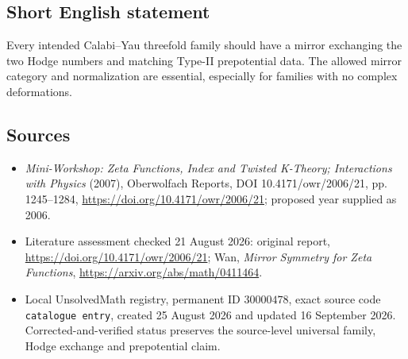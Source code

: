 \documentclass[11pt]{article}
\begin{document}
\subsection{Short English statement}
Every intended Calabi--Yau threefold family should have a mirror exchanging the two Hodge numbers and matching Type-II prepotential data. The allowed mirror category and normalization are essential, especially for families with no complex deformations.
\subsection{Sources}
\begin{itemize}
\item \emph{Mini-Workshop: Zeta Functions, Index and Twisted K-Theory; Interactions with Physics} (2007), Oberwolfach Reports, DOI 10.4171/owr/2006/21, pp. 1245--1284, \url{https://doi.org/10.4171/owr/2006/21}; proposed year supplied as 2006.
\item Literature assessment checked 21 August 2026: original report, \url{https://doi.org/10.4171/owr/2006/21}; Wan, \emph{Mirror Symmetry for Zeta Functions}, \url{https://arxiv.org/abs/math/0411464}.
\item Local UnsolvedMath registry, permanent ID $30000478$, exact source code \texttt{catalogue entry}, created 25 August 2026 and updated 16 September 2026. Corrected-and-verified status preserves the source-level universal family, Hodge exchange and prepotential claim.
\end{itemize}
\end{document}
